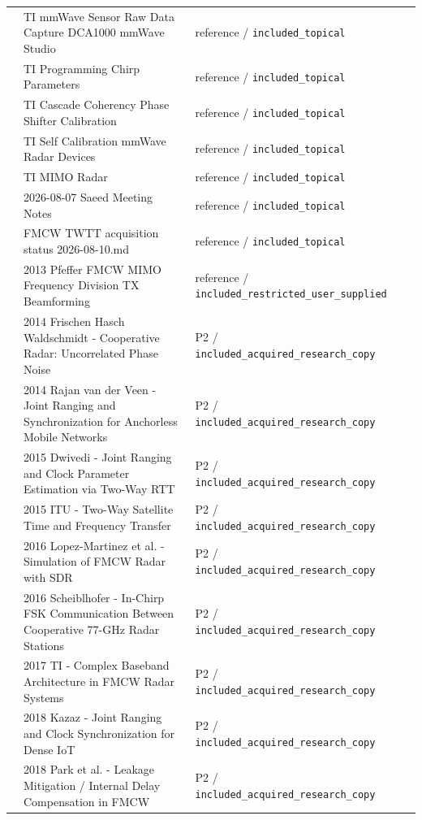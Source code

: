 \documentclass[11pt]{article}
\begin{document}
\begin{longtable}{@{}p{}p{}p{}p{}@{}}
 & TI mmWave Sensor Raw Data Capture DCA1000 mmWave Studio & reference / \nolinkurl{included_topical} &  \\
 & TI Programming Chirp Parameters & reference / \nolinkurl{included_topical} &  \\
 & TI Cascade Coherency Phase Shifter Calibration & reference / \nolinkurl{included_topical} &  \\
 & TI Self Calibration mmWave Radar Devices & reference / \nolinkurl{included_topical} &  \\
 & TI MIMO Radar & reference / \nolinkurl{included_topical} &  \\
 & 2026-08-07 Saeed Meeting Notes & reference / \nolinkurl{included_topical} &  \\
 & FMCW TWTT acquisition status 2026-08-10.md & reference / \nolinkurl{included_topical} &  \\
 & 2013 Pfeffer FMCW MIMO Frequency Division TX Beamforming & reference / \nolinkurl{included_restricted_user_supplied} &  \\
 & 2014 Frischen Hasch Waldschmidt - Cooperative Radar: Uncorrelated Phase Noise & P2 / \nolinkurl{included_acquired_research_copy} &  \\
 & 2014 Rajan van der Veen - Joint Ranging and Synchronization for Anchorless Mobile Networks & P2 / \nolinkurl{included_acquired_research_copy} &  \\
 & 2015 Dwivedi - Joint Ranging and Clock Parameter Estimation via Two-Way RTT & P2 / \nolinkurl{included_acquired_research_copy} &  \\
 & 2015 ITU - Two-Way Satellite Time and Frequency Transfer & P2 / \nolinkurl{included_acquired_research_copy} &  \\
 & 2016 Lopez-Martinez et al. - Simulation of FMCW Radar with SDR & P2 / \nolinkurl{included_acquired_research_copy} &  \\
 & 2016 Scheiblhofer - In-Chirp FSK Communication Between Cooperative 77-GHz Radar Stations & P2 / \nolinkurl{included_acquired_research_copy} &  \\
 & 2017 TI - Complex Baseband Architecture in FMCW Radar Systems & P2 / \nolinkurl{included_acquired_research_copy} &  \\
 & 2018 Kazaz - Joint Ranging and Clock Synchronization for Dense IoT & P2 / \nolinkurl{included_acquired_research_copy} &  \\
 & 2018 Park et al. - Leakage Mitigation / Internal Delay Compensation in FMCW & P2 / \nolinkurl{included_acquired_research_copy} &  \\

\end{longtable}
\end{document}
